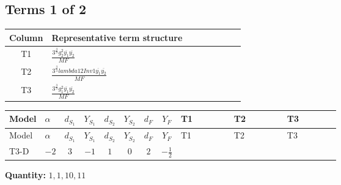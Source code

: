 \documentclass[8pt]{article}
\begin{document}
\begin{landscape}
\subsection*{Terms 1 of 2}
\begin{center}
\begin{tabular}{@{}c >{\raggedright\arraybackslash}p{0.82\linewidth}@{}}
\toprule
Column & Representative term structure \\
\midrule
T1 & \(\displaystyle \frac{3^{\frac{3}{4}} g_{2}^{2} \overline{y_{1}} \overline{y_{2}}}{MF}\) \\
\midrule
T2 & \(\displaystyle \frac{3^{\frac{3}{4}} lambda12Inv1 \overline{y_{1}} \overline{y_{2}}}{MF}\) \\
\midrule
T3 & \(\displaystyle \frac{3^{\frac{3}{4}} g_{1}^{2} \overline{y_{1}} \overline{y_{2}}}{MF}\) \\
\midrule
\bottomrule
\end{tabular}
\end{center}
\smallskip
\tiny
\begin{longtable}{@{}llcccccc >{\raggedright\arraybackslash}p{0.21\linewidth} >{\raggedright\arraybackslash}p{0.21\linewidth} >{\raggedright\arraybackslash}p{0.21\linewidth}@{}}
\toprule
Model & $\alpha$ & $d_{S_1}$ & $Y_{S_1}$ & $d_{S_2}$ & $Y_{S_2}$ & $d_F$ & $Y_F$ & T1 & T2 & T3 \\
\midrule
\endfirsthead
\toprule
Model & $\alpha$ & $d_{S_1}$ & $Y_{S_1}$ & $d_{S_2}$ & $Y_{S_2}$ & $d_F$ & $Y_F$ & T1 & T2 & T3 \\
\midrule
\endhead
T3-D & $-2$ & $3$ & $-1$ & $1$ & $0$ & $2$ & $-\frac{1}{2}$ & \scriptsize\adjustbox{max width=\linewidth}{$\begin{gathered} - \frac{11 \cdot 3^{\frac{3}{4}} g_{2}^{2} \overline{y_{1}} \overline{y_{2}}}{8 MF}\end{gathered}$} & \scriptsize\adjustbox{max width=\linewidth}{$\begin{gathered} - \frac{3^{\frac{3}{4}} lambda12Inv1 \overline{y_{1}} \overline{y_{2}}}{6 MF}\end{gathered}$} & \scriptsize\adjustbox{max width=\linewidth}{$\begin{gathered} - \frac{3^{\frac{3}{4}} g_{1}^{2} \overline{y_{1}} \overline{y_{2}}}{8 MF}\end{gathered}$} \\
\midrule
\bottomrule
\end{longtable}
\clearpage
\noindent\textbf{Quantity: }$\mathrm{1,1,10,11}$\par\smallskip

\end{landscape}
\end{document}
